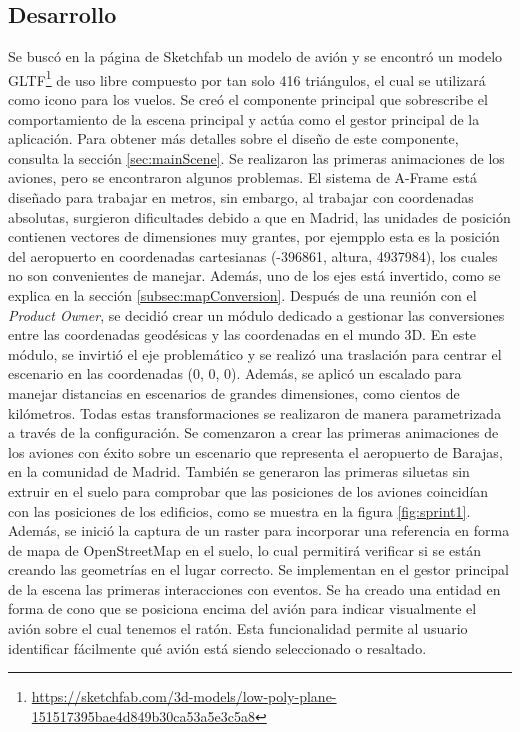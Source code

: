 \documentclass[a4paper, 11pt]{book}
\begin{document}
\subsection{Desarrollo}
Se buscó en la página de Sketchfab un modelo de avión y se encontró un modelo GLTF\footnote{\url{https://sketchfab.com/3d-models/low-poly-plane-151517395bae4d849b30ca53a5e3c5a8}} de uso libre compuesto por tan solo 416 triángulos, el cual se utilizará como icono para los vuelos.
Se creó el componente principal que sobrescribe el comportamiento de la escena principal y actúa como el gestor principal de la aplicación. Para obtener más detalles sobre el diseño de este componente, consulta la sección \ref{sec:mainScene}.
Se realizaron las primeras animaciones de los aviones, pero se encontraron algunos problemas. El sistema de A-Frame está diseñado para trabajar en metros, sin embargo, al trabajar con coordenadas absolutas, surgieron dificultades debido a que en Madrid, las unidades de posición contienen vectores de dimensiones muy grantes, por ejempplo esta es la posición del aeropuerto en coordenadas cartesianas (-396861, altura, 4937984), los cuales no son convenientes de manejar. Además, uno de los ejes está invertido, como se explica en la sección \ref{subsec:mapConversion}.
Después de una reunión con el \emph{Product Owner}, se decidió crear un módulo dedicado a gestionar las conversiones entre las coordenadas geodésicas y las coordenadas en el mundo 3D. En este módulo, se invirtió el eje problemático y se realizó una traslación para centrar el escenario en las coordenadas (0, 0, 0). Además, se aplicó un escalado para manejar distancias en escenarios de grandes dimensiones, como cientos de kilómetros. Todas estas transformaciones se realizaron de manera parametrizada a través de la configuración.
Se comenzaron a crear las primeras animaciones de los aviones con éxito sobre un escenario que representa el aeropuerto de Barajas, en la comunidad de Madrid. También se generaron las primeras siluetas sin extruir en el suelo para comprobar que las posiciones de los aviones coincidían con las posiciones de los edificios, como se muestra en la figura \ref{fig:sprint1}.
Además, se inició la captura de un raster para incorporar una referencia en forma de mapa de OpenStreetMap en el suelo, lo cual permitirá verificar si se están creando las geometrías en el lugar correcto.
Se implementan en el gestor principal de la escena las primeras interacciones con eventos. Se ha creado una entidad en forma de cono que se posiciona encima del avión para indicar visualmente el avión sobre el cual tenemos el ratón. Esta funcionalidad permite al usuario identificar fácilmente qué avión está siendo seleccionado o resaltado.
\end{document}
